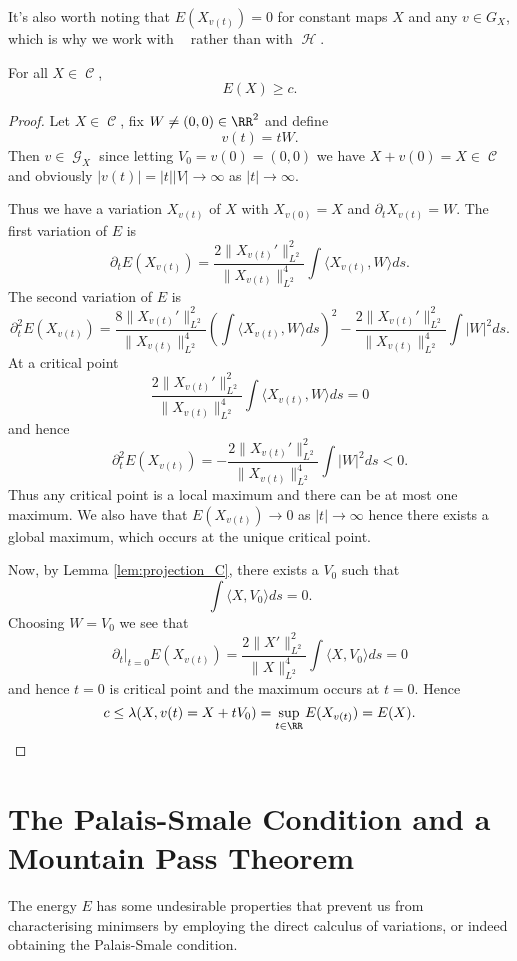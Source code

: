 \documentclass[12pt]{article}
\DeclareMathOperator{\HS}{\mathcal{H}}
\DeclareMathOperator{\HSnc}{\HS_0}
\DeclareMathOperator{\C}{\mathcal{C}}
\newcommand{\inpr}[2]{\ensuremath{\langle{#1},{#2}\rangle}}
\DeclareMathOperator{\G}{\mathcal{G}}
\begin{document}
It's also worth noting that \(E(X_{v(t)}) = 0\) for constant maps \(X\) and any \(v \in G_X\), which is why we work with \(\HSnc\) rather than with \(\HS\).

\begin{lemma}
\label{lem:E_bounded_by_c}
For all \(X \in \C\),
\[
E(X) \geq c.
\]
\end{lemma}

\begin{proof}
Let \(X \in \C\), fix \(W \ne (0, 0) \in \RR^2\) and define
\[
v(t) = t W.
\]
Then \(v \in \G_X\) since letting \(V_0 = v(0) = (0, 0)\) we have \(X + v(0) = X \in \C\) and obviously \(|v(t)| = |t| |V| \to \infty\) as \(|t| \to \infty\).

Thus we have a variation \(X_{v(t)}\) of \(X\) with \(X_{v(0)} = X\) and \(\partial_t X_{v(t)} = W\). The first variation of \(E\) is
\[
\partial_t E(X_{v(t)}) = \frac{2\|X_{v(t)}'\|_{L^2}^2}{\|X_{v(t)}\|_{L^2}^4} \int \inpr{X_{v(t)}}{W} ds.
\]
The second variation of \(E\) is
\[
\partial_t^2 E(X_{v(t)}) = \frac{8\|X_{v(t)}'\|_{L^2}^2}{\|X_{v(t)}\|_{L^2}^4} \left(\int \inpr{X_{v(t)}}{W} ds\right)^2 - \frac{2\|X_{v(t)}'\|_{L^2}^2}{\|X_{v(t)}\|_{L^2}^4} \int |W|^2 ds.
\]
At a critical point
\[
\frac{2\|X_{v(t)}'\|_{L^2}^2}{\|X_{v(t)}\|_{L^2}^4} \int \inpr{X_{v(t)}}{W} ds = 0
\]
and hence
\[
\partial_t^2 E(X_{v(t)}) = - \frac{2\|X_{v(t)}'\|_{L^2}^2}{\|X_{v(t)}\|_{L^2}^4} \int |W|^2 ds < 0.
\]
Thus any critical point is a local maximum and there can be at most one maximum. We also have that \(E(X_{v(t)}) \to 0\) as \(|t| \to \infty\) hence there exists a global maximum, which occurs at the unique critical point.

Now, by Lemma \ref{lem:projection_C}, there exists a \(V_0\) such that
\[
\int \inpr{X}{V_0} ds = 0.
\]
Choosing \(W = V_0\) we see that
\[
\partial_t|_{t=0} E(X_{v(t)}) = \frac{2\|X'\|_{L^2}^2}{\|X\|_{L^2}^4} \int \inpr{X}{V_0} ds = 0
\]
and hence \(t = 0\) is critical point and the maximum occurs at \(t = 0\). Hence
\[
c \leq \lambda(X, v(t) = X + tV_0) = \sup_{t \in \RR} E(X_{v(t)}) = E(X).
\]
\end{proof}

\section{The Palais-Smale Condition and a Mountain Pass Theorem}
\label{sec-3}

The energy \(E\) has some undesirable properties that prevent us from characterising minimsers by employing the direct calculus of variations, or indeed obtaining the Palais-Smale condition.
\end{document}
